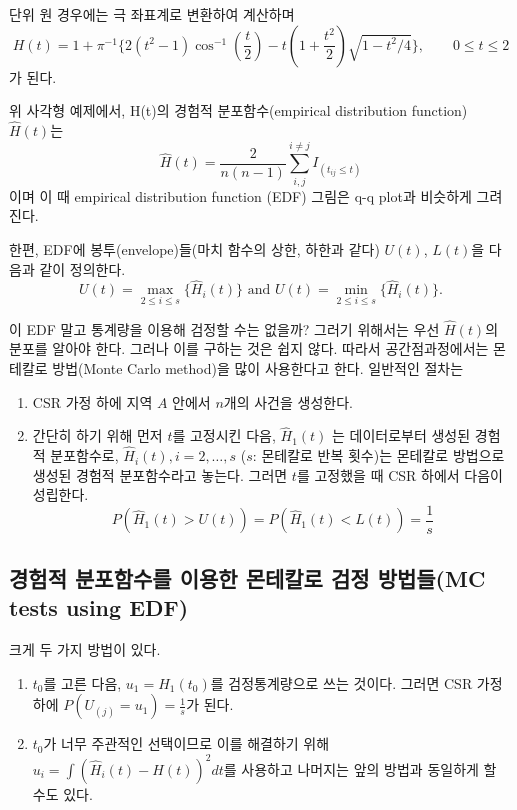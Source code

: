 \documentclass[b5paper,]{book}
\theoremstyle{definition}
\theoremstyle{definition}
\theoremstyle{definition}
\theoremstyle{remark}
\begin{document}
단위 원 경우에는 극 좌표계로 변환하여 계산하며
\[H(t)=1+\pi^{-1}\{2(t^{2}-1)\cos^{-1}(\frac{t}{2})-t(1+\frac{t^{2}}{2})\sqrt{1-t^{2}/4}\}, \qquad{0\leq t \leq 2}\]
가 된다.

위 사각형 예제에서, H(t)의 경험적 분포함수(empirical distribution
function) \(\hat{H}(t)\)는
\[\hat{H}(t)=\frac{2}{n(n-1)}\sum_{i,j}^{i\neq j}I_{(t_{ij}\leq t)}\]
이며 이 때 empirical distribution function (EDF) 그림은 q-q plot과
비슷하게 그려진다.

한편, EDF에 봉투(envelope)들(마치 함수의 상한, 하한과 같다) \(U(t)\),
\(L(t)\)을 다음과 같이 정의한다.
\[U(t)=\max_{2\leq i \leq s}\{\hat{H}_{i}(t)\} \text{ and } U(t)=\min_{2\leq i \leq s}\{\hat{H}_{i}(t)\}.\]

이 EDF 말고 통계량을 이용해 검정할 수는 없을까? 그러기 위해서는 우선
\(\hat{H}(t)\)의 분포를 알아야 한다. 그러나 이를 구하는 것은 쉽지 않다.
따라서 공간점과정에서는 몬테칼로 방법(Monte Carlo method)을 많이
사용한다고 한다. 일반적인 절차는

\begin{enumerate}
\def\labelenumi{\arabic{enumi}.}
\item
  CSR 가정 하에 지역 \(A\) 안에서 \(n\)개의 사건을 생성한다.
\item
  간단히 하기 위해 먼저 \(t\)를 고정시킨 다음, \(\hat{H}_{1}(t)\) 는
  데이터로부터 생성된 경험적 분포함수로,
  \(\hat{H}_{i}(t), i=2,\ldots, s\) (\(s\): 몬테칼로 반복 횟수)는
  몬테칼로 방법으로 생성된 경험적 분포함수라고 놓는다. 그러면 \(t\)를
  고정했을 때 CSR 하에서 다음이 성립한다.
  \[P(\hat{H}_{1}(t)>U(t))=P(\hat{H}_{1}(t)<L(t))=\frac{1}{s}\]
\end{enumerate}

\subsection{경험적 분포함수를 이용한 몬테칼로 검정 방법들(MC tests using
EDF)}\label{-----mc-tests-using-edf}

크게 두 가지 방법이 있다.

\begin{enumerate}
\def\labelenumi{\arabic{enumi}.}
\item
  \(t_{0}\)를 고른 다음, \(u_{1}=\hat{H}_{1}(t_{0})\)를 검정통계량으로
  쓰는 것이다. 그러면 CSR 가정 하에 \(P(U_{(j)}=u_{1})=\frac{1}{s}\)가
  된다.
\item
  \(t_{0}\)가 너무 주관적인 선택이므로 이를 해결하기 위해
  \(u_{i}=\int (\hat{H}_{i}(t)-H(t) )^{2}dt\)를 사용하고 나머지는 앞의
  방법과 동일하게 할 수도 있다.
\end{enumerate}
\end{document}
